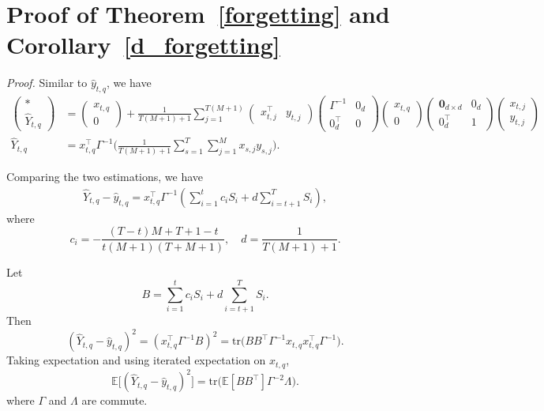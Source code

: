 \documentclass{article}
\theoremstyle{plain}
\theoremstyle{definition}
\theoremstyle{remark}
\begin{document}
\vspace{-0.1in}\section{Proof of Theorem~\ref{forgetting} and Corollary~\ref{d_forgetting}}
\textit{Proof.} Similar to $\hat{y}_{t,q}$, we have
\begin{align*}
   \begin{pmatrix}
    * \\ \hat{Y}_{t,q}
\end{pmatrix} &= \begin{pmatrix}
    x_{t,q} \\0
\end{pmatrix} + \frac{1}{T(M+1)+1}\sum_{j=1}^{T(M+1)}\begin{pmatrix}
    x_{t,j}^\top & y_{t,j}
\end{pmatrix}\begin{pmatrix}
  \Gamma^{-1}&0_d \\
  0^\top_d&0
\end{pmatrix}\begin{pmatrix}
    x_{t,q} \\ 0
\end{pmatrix}\begin{pmatrix}
    \textbf{0}_{d\times d} & 0_d \\ 0_d^\top & 1
\end{pmatrix}\begin{pmatrix}
    x_{t,j}\\y_{t,j}
\end{pmatrix} \\
\hat{Y}_{t,q} &= x_{t,q}^\top\Gamma^{-1}
\Big(\frac{1}{T(M+1)+1}\sum_{s=1}^T \sum_{j=1}^M x_{s,j}y_{s,j}\Big).
\end{align*}

Comparing the two estimations, we have 
\begin{align*}
    \hat{Y}_{t,q} - \hat{y}_{t,q} = x_{t,q}^\top\Gamma^{-1}(\sum_{i=1}^tc_iS_i + d\sum_{i=t+1}^TS_i),
\end{align*}
where\[
c_i = - \frac{(T-t)M + T+1-t}{t(M+1)(T+M+1)},\quad d = \frac{1}{T(M+1)+1}.
\]

Let
\[
B=\sum_{i=1}^t c_i S_i + d\sum_{i=t+1}^T S_i.
\]
Then
\[
(\hat{Y}_{t,q}-\hat{y}_{t,q})^2 = (x_{t,q}^\top \Gamma^{-1} B)^2 = \mathrm{tr}\big( B B^\top \Gamma^{-1} x_{t,q} x_{t,q}^\top \Gamma^{-1}\big).
\]
Taking expectation and using iterated expectation on \(x_{t,q}\),
\[
\mathbb{E}\big[(\hat{Y}_{t,q}-\hat{y}_{t,q})^2\big]
= \mathrm{tr}\big(\mathbb{E}[BB^\top]\Gamma^{-2}\Lambda\big).
\]
where $\Gamma$ and $\Lambda$ are commute.
\end{document}
